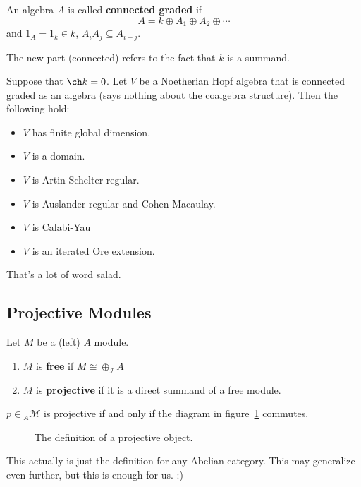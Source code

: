 \documentclass[12pt]{article}
\begin{document}
\begin{defn}
	An algebra $A$ is called \textbf{connected graded} if 
	\[A=k\oplus A_1\oplus A_2\oplus \cdots\]
	and $1_A=1_k\in k$, $A_iA_j\subseteq A_{i+j}$. 

	The new part (connected) refers to the fact that $k$ is a summand.
\end{defn}
\begin{thm}
	Suppose that $\ch k=0$. Let $V$ be a Noetherian Hopf algebra that is connected graded as an algebra (says nothing about the coalgebra structure).
	Then the following hold:
	\begin{itemize}
		\item $V$ has finite global dimension.
		\item $V$ is a domain.
		\item $V$ is Artin-Schelter regular.
		\item $V$ is Auslander regular and Cohen-Macaulay.
		\item $V$ is Calabi-Yau
		\item $V$ is an iterated Ore extension.
	\end{itemize}
\end{thm}
That's a lot of word salad.

\subsection{Projective Modules}
\begin{defn}
	Let $M$ be a (left) $A$ module. 
	\begin{enumerate}
		\item $M$ is \textbf{free} if $M\cong \oplus_\mathcal{I} A$
		\item $M$ is \textbf{projective} if it is a direct summand of a free module.
	\end{enumerate}
\end{defn}
\begin{lem}
	$p\in{_A\mathscr{M}}$ is projective if and only if the diagram in figure~\ref{fig-proj2} commutes.
\end{lem}
\begin{figure}[h]
	\centering
	\caption{The definition of a projective object.}
	\label{fig-proj2}
\end{figure}
\begin{rmk}
	This actually is just the definition for any Abelian category. This may generalize even further, but this is enough for us. :)
\end{rmk}
\end{document}
